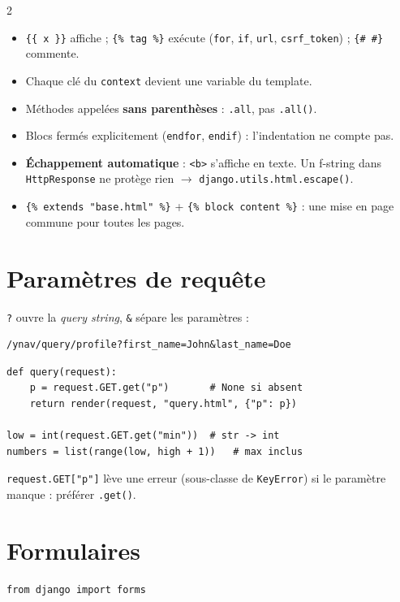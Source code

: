 \documentclass[a4paper,10pt]{article}
\newcommand{\co}[1]{\texttt{\textcolor{codefg}{#1}}}
\begin{document}
\begin{multicols}{2}
\begin{itemize}
  \item \co{\{\{ x \}\}} affiche ; \co{\{\% tag \%\}} exécute
        (\co{for}, \co{if}, \co{url}, \co{csrf\_token}) ;
        \co{\{\# \#\}} commente.
  \item Chaque clé du \co{context} devient une variable du template.
  \item Méthodes appelées \textbf{sans parenthèses} : \co{.all}, pas
        \co{.all()}.
  \item Blocs fermés explicitement (\co{endfor}, \co{endif}) :
        l'indentation ne compte pas.
  \item \textbf{Échappement automatique} : \co{<b>} s'affiche en texte. Un
        f-string dans \co{HttpResponse} ne protège rien
        $\to$ \co{django.utils.html.escape()}.
  \item \co{\{\% extends "base.html" \%\}} + \co{\{\% block content \%\}} :
        une mise en page commune pour toutes les pages.
\end{itemize}

\section{Paramètres de requête}

\co{?} ouvre la \emph{query string}, \co{\&} sépare les paramètres :
\begin{lstlisting}
/ynav/query/profile?first_name=John&last_name=Doe
\end{lstlisting}

\begin{lstlisting}
def query(request):
    p = request.GET.get("p")       # None si absent
    return render(request, "query.html", {"p": p})

low = int(request.GET.get("min"))  # str -> int
numbers = list(range(low, high + 1))   # max inclus
\end{lstlisting}

\co{request.GET["p"]} lève une erreur (sous-classe de \co{KeyError}) si le
paramètre manque : préférer \co{.get()}.

\section{Formulaires}

\begin{lstlisting}
from django import forms


\end{lstlisting}
\end{multicols}
\end{document}
